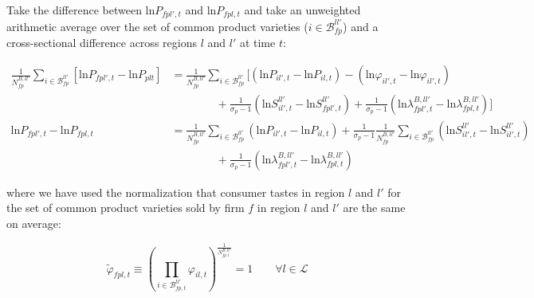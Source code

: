 \noindent Take the difference between $\text{ln} P_{fpl',t}$ and $\text{ln} P_{fpl,t}$ and take an unweighted arithmetic average over the set of common product varieties ($i \in \mathcal{B}^{ll'}_{fp}$) and a cross-sectional difference across regions $l$ and $l'$ at time $t$:
\begin{linenomath*}    
\begin{equation*}
    \begin{aligned}
        \frac{1}{N^{B,ll'}_{fp}} \sum_{i \in \mathcal{B}^{ll'}_{fp}} 
            \left[\text{ln}P_{fpl',t} - \text{ln} P_{plt}\right] 
            &=  \frac{1}{N^{B,ll'}_{fp}} \sum_{i \in \mathcal{B}^{ll'}_{fp}} 
                \Bigg[ 
                    \left(\text{ln}P_{il',t} - \text{ln}P_{il,t} \right) 
                    - \left(\text{ln}\varphi_{il',t} - \text{ln}\varphi_{il',t} \right) \\
                    & \qquad \qquad 
                    + \frac{1}{\sigma_p-1}
                        \left(\text{ln}S^{ll'}_{il',t} - \text{ln}S^{ll'}_{fpl',t} \right)
                    + \frac{1}{\sigma_p-1}
                        \left(\text{ln} \lambda^{B,ll'}_{fpl',t} - \text{ln}\lambda^{B,ll'}_{fpl,t} \right)
                \Bigg] \\
        \text{ln}P_{fpl',t} - \text{ln} P_{fpl,t} 
            &=  \frac{1}{N^{B,ll'}_{fp}} \sum_{i \in \mathcal{B}^{ll'}_{fp}} 
                    \left(\text{ln}P_{il',t} - \text{ln}P_{il,t} \right) 
                + \frac{1}{\sigma_p-1} 
                    \frac{1}{N^{B,ll'}_{fp}} \sum_{i \in \mathcal{B}^{ll'}_{fp}} 
                    \left(\text{ln}S^{ll'}_{il',t} - \text{ln}S^{ll'}_{il',t} \right) \\
                & \qquad \qquad 
                + \frac{1}{\sigma_p-1} 
                    \left(\text{ln} \lambda^{B,ll'}_{fpl',t} - \text{ln}\lambda^{B,ll'}_{fpl,t} \right)
    \end{aligned}
\end{equation*}
\end{linenomath*}    

\noindent where we have used the normalization that consumer tastes in region $l$ and $l'$ for the set of common product varieties sold by firm $f$ in region $l$ and $l'$ are the same on average: 
\begin{linenomath*}    
\begin{equation*}
    \tilde{\varphi}_{fpl,t} \equiv 
    \left(
        \prod_{i \in \mathcal{B}^{ll'}_{fp,t}} \varphi_{il,t} 
    \right)^{\frac{1}{N^{B,ll'}_{fp,t}}} = 1 \qquad \forall l \in \mathcal{L}
\end{equation*}
\end{linenomath*}    


